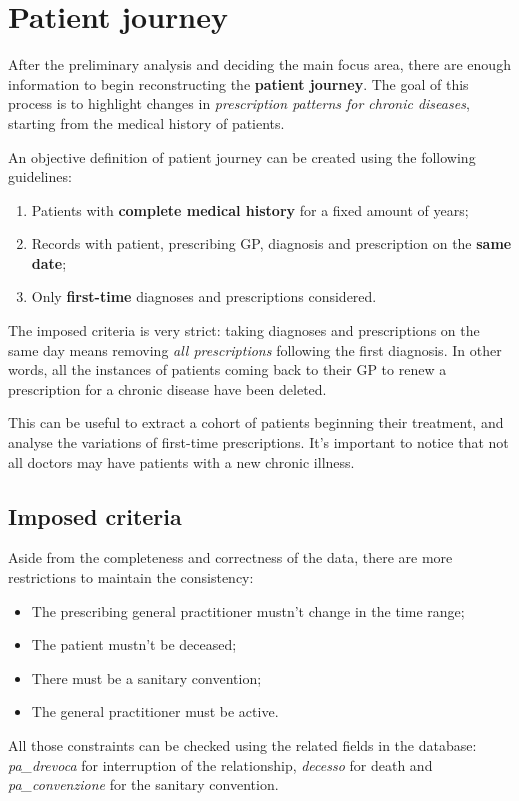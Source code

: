 \chapter[Patient journey ]{Patient journey}
After the preliminary analysis and deciding the main focus area, there are enough information to begin reconstructing the \textbf{patient journey}. The goal of this process is to highlight changes in \textit{prescription patterns for chronic diseases}, starting from the medical history of patients.

An objective definition of patient journey can be created using the following guidelines:
\begin{enumerate}
	\item Patients with \textbf{complete medical history} for a fixed amount of years;
	\item Records with patient, prescribing GP, diagnosis and prescription on the \textbf{same date};
	\item Only \textbf{first-time }diagnoses and prescriptions considered.
\end{enumerate}

The imposed criteria is very strict: taking diagnoses and prescriptions on the same day means removing \textit{all prescriptions} following the first diagnosis. In other words, all the instances of patients coming back to their GP to renew a prescription for a chronic disease have been deleted.

This can be useful to extract a cohort of patients beginning their treatment, and analyse the variations of first-time prescriptions. It's important to notice that not all doctors may have patients with a new chronic illness.

\section{Imposed criteria}
Aside from the completeness and correctness of the data, there are more restrictions to maintain the consistency:
\begin{itemize}
	\item The prescribing general practitioner mustn't change in the time range;
	\item The patient mustn't be deceased;
	\item There must be a sanitary convention;
	\item The general practitioner must be active.
\end{itemize}

All those constraints can be checked using the related fields in the database: \textit{pa\_drevoca} for interruption of the relationship, \textit{decesso} for death and \textit{pa\_convenzione} for the sanitary convention.


